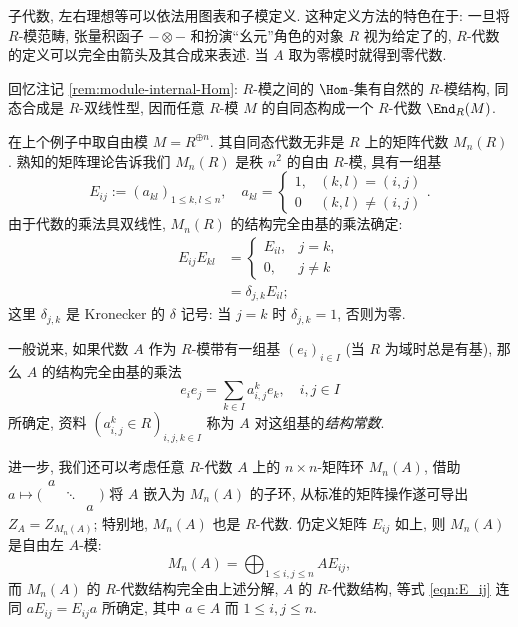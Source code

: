 子代数, 左右理想等可以依法用图表和子模定义. 这种定义方法的特色在于: 一旦将 $R$-模范畴, 张量积函子 $- \otimes -$ 和扮演``幺元''角色的对象 $R$ 视为给定了的, $R$-代数的定义可以完全由箭头及其合成来表述. 当 $A$ 取为零模时就得到零代数.

\begin{example}
	回忆注记 \ref{rem:module-internal-Hom}: $R$-模之间的 $\Hom$-集有自然的 $R$-模结构, 同态合成是 $R$-双线性型, 因而任意 $R$-模 $M$ 的自同态构成一个 $R$-代数 $\End_R(M)$.
\end{example}

\begin{example}\label{eg:matrix-algebra-1}
	在上个例子中取自由模 $M = R^{\oplus n}$. 其自同态代数无非是 $R$ 上的矩阵代数 $M_n(R)$. 熟知的矩阵理论告诉我们 $M_n(R)$ 是秩 $n^2$ 的自由 $R$-模, 具有一组基
	\[ E_{ij} := (a_{kl})_{1 \leq k,l \leq n}, \quad a_{kl} = \begin{cases} 1, & (k,l)=(i,j) \\ 0 & (k,l) \neq (i,j) \end{cases}. \]
	由于代数的乘法具双线性, $M_n(R)$ 的结构完全由基的乘法确定:
	\begin{equation}\label{eqn:E_ij}\begin{aligned}
		E_{ij} E_{kl} & = \begin{cases} E_{il}, & j=k, \\ 0, & j \neq k \end{cases} \\
		& = \delta_{j,k} E_{il};
	\end{aligned}\end{equation}
	这里 $\delta_{j,k}$ 是 Kronecker 的 $\delta$ 记号: 当 $j=k$ 时 $\delta_{j,k}=1$, 否则为零.
\end{example}

一般说来, 如果代数 $A$ 作为 $R$-模带有一组基 $(e_i)_{i \in I}$ (当 $R$ 为域时总是有基), 那么 $A$ 的结构完全由基的乘法
\[ e_i e_j = \sum_{k \in I} a^k_{i,j} e_k, \quad i,j \in I  \]
所确定, 资料 $(a^k_{i,j} \in R)_{i,j,k \in I}$ 称为 $A$ 对这组基的\emph{结构常数}.

进一步, 我们还可以考虑任意 $R$-代数 $A$ 上的 $n \times n$-矩阵环 $M_n(A)$, 借助 $a \mapsto \biggl( \begin{smallmatrix} a & & \\ & \ddots & \\ & & a \end{smallmatrix} \biggr)$ 将 $A$ 嵌入为 $M_n(A)$ 的子环, 从标准的矩阵操作遂可导出 $Z_A = Z_{M_n(A)}$; 特别地, $M_n(A)$ 也是 $R$-代数. 仍定义矩阵 $E_{ij}$ 如上, 则 $M_n(A)$ 是自由左 $A$-模:
\[ M_n(A) = \bigoplus_{1 \leq i,j \leq n} A E_{ij}, \]
而 $M_n(A)$ 的 $R$-代数结构完全由上述分解, $A$ 的 $R$-代数结构, 等式 \eqref{eqn:E_ij} 连同 $a E_{ij} = E_{ij} a$ 所确定, 其中 $a \in A$ 而 $1 \leq i,j \leq n$.

